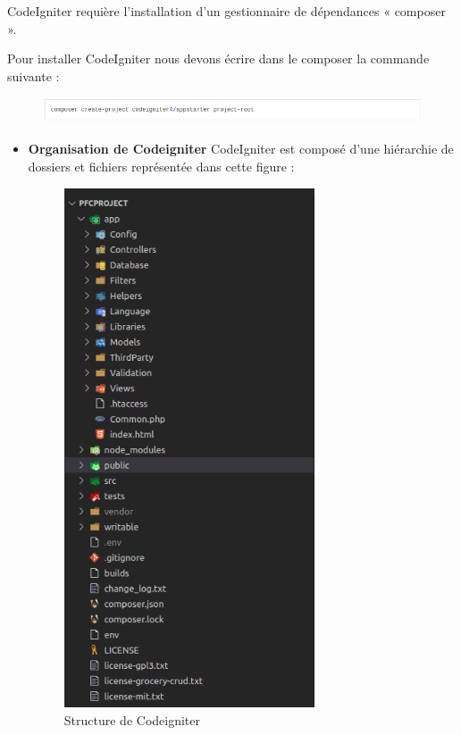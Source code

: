 \documentclass[french]{report}
\begin{document}
CodeIgniter  requière l'installation d'un gestionnaire de dépendances « composer
».

Pour installer CodeIgniter  nous devons écrire dans le composer la commande
suivante :

\begin{figure}[H]
    \centering
    \includegraphics[width=1\textwidth]{images/codeigniter.png}
    \label{fig:my_label}
\end{figure}

\begin{itemize}
    \item \textbf{Organisation de Codeigniter}
    CodeIgniter  est composé d'une hiérarchie de dossiers et fichiers
        représentée dans cette figure :
    
    \begin{figure}[H]
        \centering
        \includegraphics[width=0.7\textwidth]{images/ci structure.png}
        \caption{Structure de Codeigniter}
        \label{fig:my_label}
    \end{figure}


\end{itemize}
\end{document}
